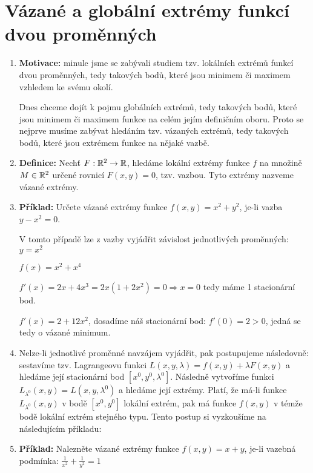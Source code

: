 
\section{Vázané a globální extrémy funkcí dvou proměnných}

\begin{enumerate}

\item \textbf{Motivace:} minule jsme se zabývali studiem tzv. lokálních extrémů funkcí dvou proměnných, tedy takových bodů, které jsou minimem či maximem vzhledem ke svému okolí.

Dnes chceme dojít k pojmu globálních extrémů, tedy takových bodů, které jsou minimem či maximem funkce na celém jejím definičním oboru. Proto se nejprve musíme zabývat hledáním tzv. vázaných extrémů, tedy takových bodů, které jsou extrémem funkce na nějaké vazbě. 

\item \textbf{Definice:} Nechť $F:\mathbb{R}^2 \rightarrow \mathbb{R}$, hledáme lokální extrémy funkce $f$ na množině $M \in \mathbb{R}^2$ určené rovnicí $F(x,y)=0$, tzv. vazbou. Tyto extrémy nazveme vázané extrémy. 

\item \textbf{Příklad:} Určete vázané extrémy funkce $f(x,y) = x^2 + y^2$, je-li vazba $y - x^2 = 0$.

V tomto případě lze z vazby vyjádřit závislost jednotlivých proměnných: $y = x^2$

$f(x) = x^2 + x^4$

$f'(x) = 2x + 4x^3 = 2x(1+2x^2) = 0 \Rightarrow x=0$ tedy máme 1 stacionární bod.

$f'(x) = 2 + 12x^2$, dosadíme náš stacionární bod:
$f'(0) = 2 > 0$, jedná se tedy o vázané minimum. 

\item Nelze-li jednotlivé proměnné navzájem vyjádřit, pak postupujeme následovně: sestavíme tzv. Lagrangeovu funkci 
$L(x,y,\lambda) = f(x,y) + \lambda F(x,y)$ 
a hledáme její stacionární bod 
$[x^0,y^0,\lambda^0]$. 
Následně vytvoříme funkci
$L_{\lambda^0}(x,y) = L(x,y,\lambda^0)$ 
a hledáme její extrémy. Platí, že má-li funkce 
$L_{\lambda^0}(x,y)$ v bodě $[x^0,y^0]$ lokální extrém, pak má funkce $f(x,y)$ v témže bodě lokální extrém stejného typu. Tento postup si vyzkoušíme na následujícím příkladu:

\item \textbf{Příklad:} Nalezněte vázané extrémy funkce $f(x,y) = x + y$, je-li vazebná podmínka: $\frac{1}{x^2} + \frac{1}{y^2} = 1$


\end{enumerate}

